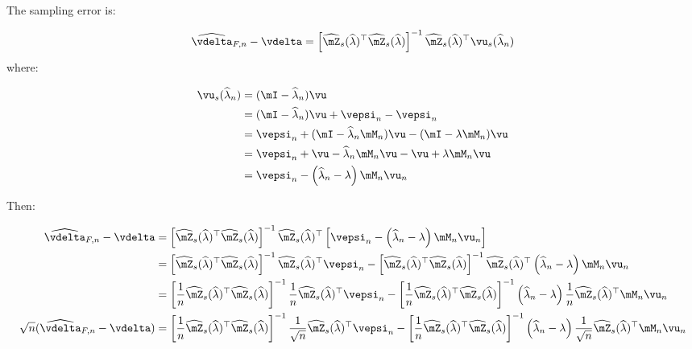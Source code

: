 \begin{subappendices}
The sampling error is:

\begin{equation}
  \widehat{\vdelta}_{F, n} - \vdelta = \left[\widehat{\mZ}_s(\widehat{\lambda})^\top\widehat{\mZ}_s(\widehat{\lambda})\right]^{-1}\widehat{\mZ}_s(\widehat{\lambda})^\top\vu_s(\widehat{\lambda}_n)
\end{equation}
%
where:

\begin{equation}
  \begin{aligned}
    \vu_s(\widehat{\lambda}_n) & = (\mI - \widehat{\lambda}_n)\vu \\
                               & = (\mI - \widehat{\lambda}_n)\vu + \vepsi_n - \vepsi_n \\
                               & = \vepsi_n  + (\mI - \widehat{\lambda}_n\mM_n)\vu - (\mI - \lambda\mM_n)\vu \\
                               & = \vepsi_n  + \vu  - \widehat{\lambda}_n\mM_n\vu - \vu + \lambda\mM_n\vu \\
                               & = \vepsi_n - \left(\widehat{\lambda}_n- \lambda\right)\mM_n\vu_n
  \end{aligned}
\end{equation}

Then:

\begin{equation}
  \begin{aligned}
    \widehat{\vdelta}_{F, n} - \vdelta & = \left[\widehat{\mZ}_s(\widehat{\lambda})^\top\widehat{\mZ}_s(\widehat{\lambda})\right]^{-1}\widehat{\mZ}_s(\widehat{\lambda})^\top\left[\vepsi_n - \left(\widehat{\lambda}_n- \lambda\right)\mM_n\vu_n\right] \\
     & = \left[\widehat{\mZ}_s(\widehat{\lambda})^\top\widehat{\mZ}_s(\widehat{\lambda})\right]^{-1}\widehat{\mZ}_s(\widehat{\lambda})^\top\vepsi_n - \left[\widehat{\mZ}_s(\widehat{\lambda})^\top\widehat{\mZ}_s(\widehat{\lambda})\right]^{-1}\widehat{\mZ}_s(\widehat{\lambda})^\top\left(\widehat{\lambda}_n- \lambda\right)\mM_n\vu_n \\
     & = \left[\frac{1}{n}\widehat{\mZ}_s(\widehat{\lambda})^\top\widehat{\mZ}_s(\widehat{\lambda})\right]^{-1}\frac{1}{n}\widehat{\mZ}_s(\widehat{\lambda})^\top\vepsi_n - \left[\frac{1}{n}\widehat{\mZ}_s(\widehat{\lambda})^\top\widehat{\mZ}_s(\widehat{\lambda})\right]^{-1}\left(\widehat{\lambda}_n- \lambda\right)\frac{1}{n}\widehat{\mZ}_s(\widehat{\lambda})^\top\mM_n\vu_n \\
 \sqrt{n} (\widehat{\vdelta}_{F, n} - \vdelta)   & = \left[\frac{1}{n}\widehat{\mZ}_s(\widehat{\lambda})^\top\widehat{\mZ}_s(\widehat{\lambda})\right]^{-1}\frac{1}{\sqrt{n}}\widehat{\mZ}_s(\widehat{\lambda})^\top\vepsi_n - \left[\frac{1}{n}\widehat{\mZ}_s(\widehat{\lambda})^\top\widehat{\mZ}_s(\widehat{\lambda})\right]^{-1}\left(\widehat{\lambda}_n- \lambda\right)\frac{1}{\sqrt{n}}\widehat{\mZ}_s(\widehat{\lambda})^\top\mM_n\vu_n
  \end{aligned}
\end{equation}


\end{subappendices}
